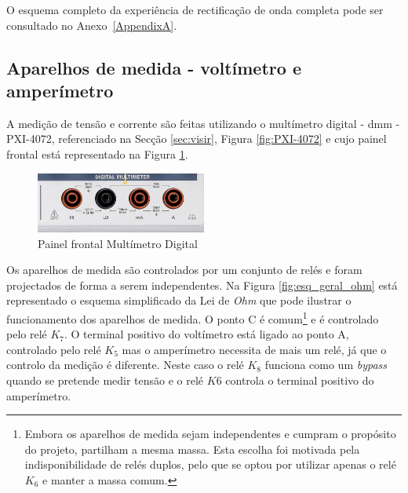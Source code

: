 O esquema completo da experiência de rectificação de onda completa pode ser consultado no Anexo~\ref{AppendixA}.




\subsection{Aparelhos de medida - voltímetro e amperímetro}
\label{sec:aparelhosmedida}

A medição de tensão e corrente são feitas utilizando o multímetro digital - \Acrfull{dmm} - PXI-4072, referenciado na Secção \ref{sec:visir}, Figura \ref{fig:PXI-4072} e cujo painel frontal está representado na Figura \ref{fig:frontDMM}.

\begin{figure}[hbtp]
	\centering
	\includegraphics[width=0.5\textwidth]{figures/promenorDMM.png}
	\caption{Painel frontal Multímetro Digital}
	\label{fig:frontDMM}
\end{figure}

Os aparelhos de medida são controlados por um conjunto de relés e foram projectados de forma a serem independentes. Na Figura \ref{fig:esq_geral_ohm} está representado o esquema simplificado da Lei de \textit{Ohm} que pode ilustrar o funcionamento dos aparelhos de medida. O ponto C é comum\footnote{Embora os aparelhos de medida sejam independentes e cumpram o propósito do projeto, partilham a mesma massa. Esta escolha foi motivada pela indisponibilidade de relés duplos, pelo que se optou por utilizar apenas o relé $K_{6}$ e manter a massa comum.}  e é controlado pelo relé $K_{7}$. O terminal positivo do voltímetro está ligado ao ponto A, controlado pelo relé $K_{5}$ mas o amperímetro necessita de mais um relé, já que o controlo da medição é diferente. Neste caso o relé $K_{8}$ funciona como um \textit{bypass} quando se pretende medir tensão e o relé $K{6}$ controla o terminal positivo do amperímetro. 

